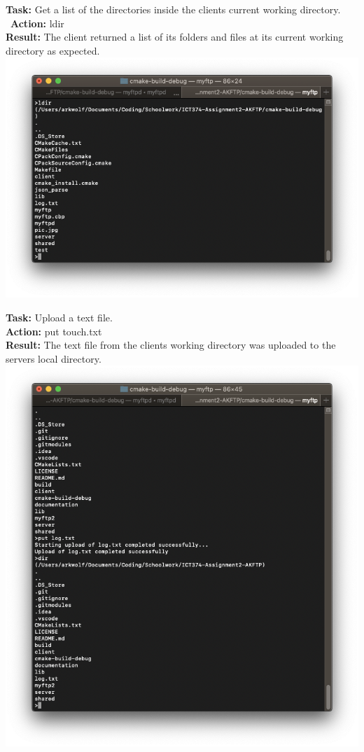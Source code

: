 \documentclass{article}
\begin{document}
\textbf{Task:} Get a list of the directories inside the clients current working directory.\\\
\textbf{Action:} ldir\\
\textbf{Result:} The client returned a list of its folders and files at its current working directory as expected.\\
\includegraphics[width=\textwidth]{testpictures/ldir}

\textbf{Task:} Upload a text file.\\
\textbf{Action:} put touch.txt\\
\textbf{Result:} The text file from the clients working directory was uploaded to the servers local directory.\\
\includegraphics[width=\textwidth]{testpictures/puttext}
\end{document}
